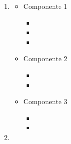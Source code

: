 \documentclass[12pt, a4paper, titlepage]{report}
\begin{document}
\begin{enumerate}
\begin{itemize}
            	        \item \lipsum[2]
            	            \begin{itemize}
            	                \item \lipsum[4]
            	            \end{itemize}
            	        \item \lipsum[2]
            	            \begin{itemize}
            	                \item \lipsum[4]
            	            \end{itemize}
            	        \item \lipsum[2]
            	    \end{itemize}
                \item \lipsum[1]
                    \begin{itemize}
            	        \item Componente 1
            	            \begin{itemize}
            	                \item \lipsum[4]
            	                \item \lipsum[4]
            	                \item \lipsum[4]
            	            \end{itemize}
            	        
            	        \item Componente 2
            	            \begin{itemize}
            	                \item \lipsum[4]
            	                \item \lipsum[4]
            	            \end{itemize}
            	        \item Componente 3
            	            \begin{itemize}
            	                \item \lipsum[4]
            	                \item \lipsum[4]
            	            \end{itemize}
                    \end{itemize}
                \item \lipsum[1]
                    
    		\end{enumerate}
    	
\end{document}
